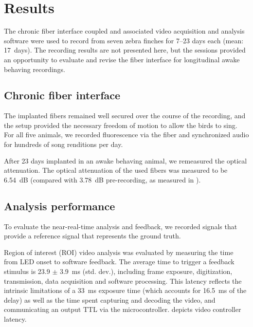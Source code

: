 \section{Results}

The chronic fiber interface coupled and associated video 
acquisition and analysis software were used to record 
from seven zebra finches for 7--23 days each (mean: 
17~days). The recording results are not 
presented here, but the sessions provided an opportunity to 
evaluate and revise the fiber interface for longitudinal 
awake behaving recordings.

\subsection{Chronic fiber interface}

The implanted fibers remained well secured over the 
course of the recording, and the setup provided the 
necessary freedom of motion to allow the birds to 
sing. For all five animals, we recorded fluorescence 
via the fiber and synchronized audio for hundreds 
of song renditions per day.

After 23 days implanted in an awake behaving animal,
we remeasured the optical attenuation. The optical 
attenuation of the used fibers was measured to be 
6.54~dB (compared with 3.78~dB pre-recording, as 
measured in ).

\subsection{Analysis performance}

To evaluate the near-real-time analysis and feedback, we recorded 
signals that provide a reference signal that represents the 
ground truth. 

Region of interest (ROI) video analysis was evaluated by measuring the
time from LED onset to software feedback. The average time to trigger 
a feedback stimulus is 23.9 $\pm$ 3.9~ms (std. dev.), 
including frame exposure, digitization, transmission, data acquisition 
and software processing. This latency reflects the intrinsic 
limitations of a 33~ms exposure time (which accounts for 16.5~ms of 
the delay) as well as the time spent capturing and decoding the video, 
and communicating an output TTL via the microcontroller. 
 depicts video controller latency.


